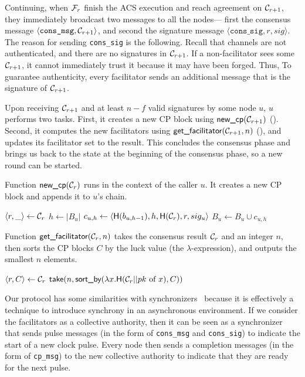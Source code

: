 Continuing, when $\mathcal{F}_{r}$ finish the ACS execution and reach agreement on $\mathcal{C}_{r+1}$,
they immediately broadcast two messages to all the nodes---
first the consensus message $\langle \texttt{cons\_msg}, \mathcal{C}_{r+1} \rangle$,
and second the signature message $\langle \texttt{cons\_sig}, r, sig \rangle$.
The reason for sending \texttt{cons\_sig} is the following.
Recall that channels are not authenticated, 
and there are no signatures in $\mathcal{C}_{r + 1}$.
If a non-facilitator sees some $\mathcal{C}_{r + 1}$, it cannot immediately trust it because it may have been forged.
Thus, To guarantee authenticity, every facilitator sends an additional message that is the signature of $\mathcal{C}_{r + 1}$.

Upon receiving $\mathcal{C}_{r + 1}$ and at least $n - f$ valid signatures by some node $u$, $u$ performs two tasks.
First, it creates a new CP block using $\textsf{new\_cp}(\mathcal{C}_{r + 1})$ ().
Second, it computes the new facilitators using $\textsf{get\_facilitator}(\mathcal{C}_{r + 1}, n)$ (),
and updates its facilitator set to the result.
This concludes the consensus phase and brings us back to the state at the beginning of the consensus phase,
so a new round can be started.

\begin{algorithm}
\caption{Function $\textsf{new\_cp}(\mathcal{C}_r)$ runs in the context of the caller $u$.
It creates a new CP block and appends it to $u$'s chain.}
\label{alg:new-cp}
\begin{algorithmic}
\State $\langle r, \_ \rangle \gets \mathcal{C}_r$
\State $h \gets |B_u|$
\State $c_{u, h} \gets \langle \textsf{H}(b_{u, h-1}), h, \textsf{H}(\mathcal{C}_r), r, sig_u \rangle$
\State $B_u \gets B_u \cup c_{u, h}$
\end{algorithmic}
\end{algorithm}

\begin{algorithm}
\caption{Function $\textsf{get\_facilitator}(\mathcal{C}_r, n)$ takes the consensus result $\mathcal{C}_r$ and an integer $n$,
then sorts the CP blocks $C$ by the luck value (the $\lambda$-expression), and outputs the smallest $n$ elements.}
\label{alg:facilitator}
\begin{algorithmic}
\State $\langle r, C \rangle \gets \mathcal{C}_r$
\State $\textsf{take} (n, \textsf{sort\_by} (\lambda x.\textsf{H}(\mathcal{C}_r || pk \text{ of } x), C))$
\end{algorithmic}
\end{algorithm}


Our protocol has some similarities with synchronizers~\cite[Chapter 10]{podc} because it is effectively a technique to introduce synchrony in an asynchronous environment.
If we consider the facilitators as a collective authority, then it can be seen as a synchronizer that sends pulse messages (in the form of \texttt{cons\_msg} and \texttt{cons\_sig}) to indicate the start of a new clock pulse.
Every node then sends a completion messages (in the form of \texttt{cp\_msg}) to the new collective authority to indicate that they are ready for the next pulse.


